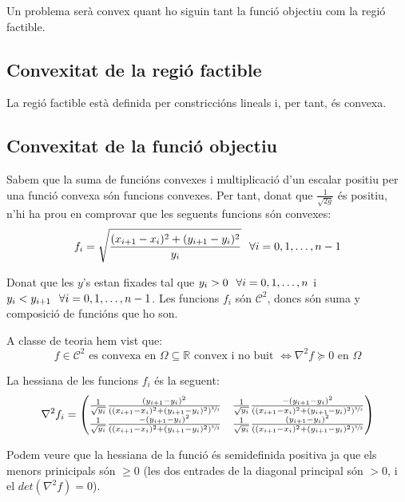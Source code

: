 \documentclass[10pt]{extarticle}
\begin{document}
Un problema serà convex quant ho siguin tant la funció objectiu com la regió factible.

\subsection{Convexitat de la regió factible}
La regió factible està definida per constriccións lineals i, per tant, és convexa.

\subsection{Convexitat de la funció objectiu}
Sabem que la suma de funcións convexes i multiplicació d'un escalar positiu per una funció convexa són funcions convexes. Per tant, donat que $\frac{1}{\sqrt{2g}}$ és positiu, n'hi ha prou en comprovar que les seguents funcions són convexes:
$$f_i = \sqrt{\frac{(x_{i+1}-x_i)^2+(y_{i+1}-y_i)^2}{y_i}} \hspace{.25cm} \forall i = 0,1,\hdots,n-1$$

Donat que les $y$'s estan fixades tal que $y_i > 0 \hspace{.25cm} \forall i = 0,1,\hdots,n$ i $y_i < y_{i+1} \hspace{.25cm} \forall i = 0,1,\hdots,n-1$. Les funcions $f_i$ són $\mathcal{C}^2$, doncs són suma y composició de funcións que ho son. \vspace{.25cm}

A classe de teoria hem vist que:
$$f \in \mathcal{C}^2\text{ es convexa en } \Omega \subseteq \mathbb{R} \text{ convex i no buit } \Longleftrightarrow \nabla^2f \succcurlyeq 0 \text{ en } \Omega$$

La hessiana de les funcions $f_i$ és la seguent:
$$
\nabla^2 f_i = 
\begin{pmatrix}
    \frac{1}{\sqrt{y_i}} \frac{(y_{i+1} - y_i)^2}{((x_{i+1} - x_i)^2 + (y_{i+1} - y_i)^2)^{\sfrac{3}{2}}} & \frac{1}{\sqrt{y_i}} \frac{- (y_{i+1} - y_i)^2}{((x_{i+1} - x_i)^2 + (y_{i+1} - y_i)^2)^{\sfrac{3}{2}}} \\
    \frac{1}{\sqrt{y_i}} \frac{- (y_{i+1} - y_i)^2}{((x_{i+1} - x_i)^2 + (y_{i+1} - y_i)^2)^{\sfrac{3}{2}}} & \frac{1}{\sqrt{y_i}} \frac{(y_{i+1} - y_i)^2}{((x_{i+1} - x_i)^2 + (y_{i+1} - y_i)^2)^{\sfrac{3}{2}}}
\end{pmatrix}
$$

Podem veure que la hessiana de la funció és semidefinida positiva ja que els menors prinicipals són $\ge 0$ (les dos entrades de la diagonal principal són $> 0$, i el $det(\nabla^2f) = 0$). \vspace{.25cm}
\end{document}
